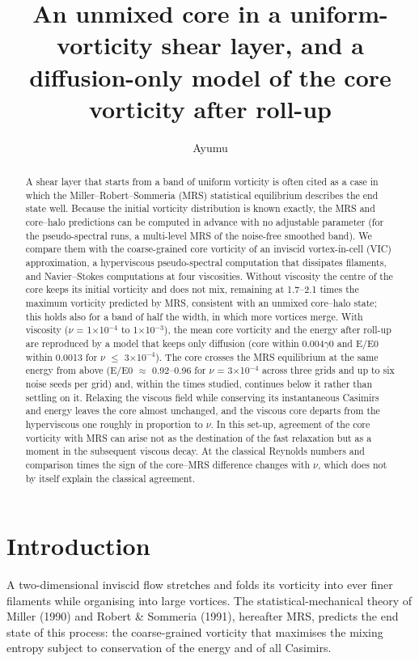 \documentclass[11pt]{article}
\title{An unmixed core in a uniform-vorticity shear layer, and a diffusion-only model of the core vorticity after roll-up}
\author{Ayumu}
\date{}
\begin{document}
\maketitle

\begin{abstract}
A shear layer that starts from a band of uniform vorticity is often cited as a case in which the Miller--Robert--Sommeria (MRS) statistical equilibrium describes the end state well. Because the initial vorticity distribution is known exactly, the MRS and core--halo predictions can be computed in advance with no adjustable parameter (for the pseudo-spectral runs, a multi-level MRS of the noise-free smoothed band). We compare them with the coarse-grained core vorticity of an inviscid vortex-in-cell (VIC) approximation, a hyperviscous pseudo-spectral computation that dissipates filaments, and Navier--Stokes computations at four viscosities. Without viscosity the centre of the core keeps its initial vorticity and does not mix, remaining at 1.7--2.1 times the maximum vorticity predicted by MRS, consistent with an unmixed core--halo state; this holds also for a band of half the width, in which more vortices merge. With viscosity ($\nu{}$ = 1$\times{}$10$^{-4}$ to 1$\times{}$10$^{-3}$), the mean core vorticity and the energy after roll-up are reproduced by a model that keeps only diffusion (core within 0.004$\gamma{}$0 and E/E0 within 0.0013 for $\nu{}$ $\le{}$ 3$\times{}$10$^{-4}$). The core crosses the MRS equilibrium at the same energy from above (E/E0 $\approx{}$ 0.92--0.96 for $\nu{}$ = 3$\times{}$10$^{-4}$ across three grids and up to six noise seeds per grid) and, within the times studied, continues below it rather than settling on it. Relaxing the viscous field while conserving its instantaneous Casimirs and energy leaves the core almost unchanged, and the viscous core departs from the hyperviscous one roughly in proportion to $\nu{}$. In this set-up, agreement of the core vorticity with MRS can arise not as the destination of the fast relaxation but as a moment in the subsequent viscous decay. At the classical Reynolds numbers and comparison times the sign of the core--MRS difference changes with $\nu{}$, which does not by itself explain the classical agreement.

\end{abstract}
\section{Introduction}

A two-dimensional inviscid flow stretches and folds its vorticity into ever finer filaments while organising into large vortices. The statistical-mechanical theory of Miller (1990) and Robert \& Sommeria (1991), hereafter MRS, predicts the end state of this process: the coarse-grained vorticity that maximises the mixing entropy subject to conservation of the energy and of all Casimirs.
\end{document}
